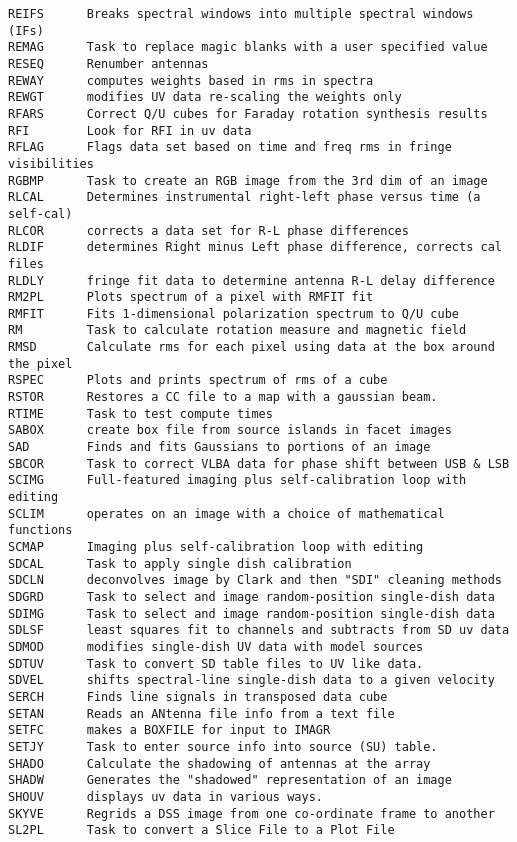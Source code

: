 \begin{verbatim}
REIFS      Breaks spectral windows into multiple spectral windows (IFs)
REMAG      Task to replace magic blanks with a user specified value
RESEQ      Renumber antennas
REWAY      computes weights based in rms in spectra
REWGT      modifies UV data re-scaling the weights only
RFARS      Correct Q/U cubes for Faraday rotation synthesis results
RFI        Look for RFI in uv data
RFLAG      Flags data set based on time and freq rms in fringe visibilities
RGBMP      Task to create an RGB image from the 3rd dim of an image
RLCAL      Determines instrumental right-left phase versus time (a self-cal)
RLCOR      corrects a data set for R-L phase differences
RLDIF      determines Right minus Left phase difference, corrects cal files
RLDLY      fringe fit data to determine antenna R-L delay difference
RM2PL      Plots spectrum of a pixel with RMFIT fit
RMFIT      Fits 1-dimensional polarization spectrum to Q/U cube
RM         Task to calculate rotation measure and magnetic field
RMSD       Calculate rms for each pixel using data at the box around the pixel
RSPEC      Plots and prints spectrum of rms of a cube
RSTOR      Restores a CC file to a map with a gaussian beam.
RTIME      Task to test compute times
SABOX      create box file from source islands in facet images
SAD        Finds and fits Gaussians to portions of an image
SBCOR      Task to correct VLBA data for phase shift between USB & LSB
SCIMG      Full-featured imaging plus self-calibration loop with editing
SCLIM      operates on an image with a choice of mathematical functions
SCMAP      Imaging plus self-calibration loop with editing
SDCAL      Task to apply single dish calibration
SDCLN      deconvolves image by Clark and then "SDI" cleaning methods
SDGRD      Task to select and image random-position single-dish data
SDIMG      Task to select and image random-position single-dish data
SDLSF      least squares fit to channels and subtracts from SD uv data
SDMOD      modifies single-dish UV data with model sources
SDTUV      Task to convert SD table files to UV like data.
SDVEL      shifts spectral-line single-dish data to a given velocity
SERCH      Finds line signals in transposed data cube
SETAN      Reads an ANtenna file info from a text file
SETFC      makes a BOXFILE for input to IMAGR
SETJY      Task to enter source info into source (SU) table.
SHADO      Calculate the shadowing of antennas at the array
SHADW      Generates the "shadowed" representation of an image
SHOUV      displays uv data in various ways.
SKYVE      Regrids a DSS image from one co-ordinate frame to another
SL2PL      Task to convert a Slice File to a Plot File

\end{verbatim}
